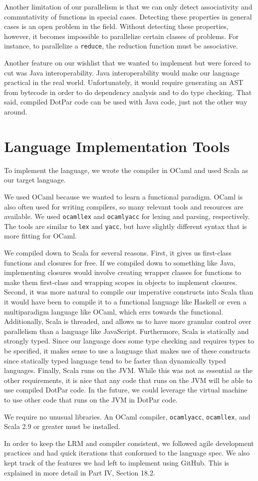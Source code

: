Another limitation of our parallelism is that we can only detect associativity
and commutativity of functions in special cases. Detecting these properties in
general cases is an open problem in the field. Without detecting these
properties, however, it becomes impossible to parallelize certain classes of
problems. For instance, to parallelize a \verb$reduce$, the reduction function
must be associative.

Another feature on our wishlist that we wanted to implement but were forced to cut was Java
interoperability. Java interoperability would make our language practical in the
real world. Unfortunately, it would require generating an AST from bytecode in
order to do dependency analysis and to do type checking. That said, compiled
DotPar code can be used with Java code, just not the other way around.

\section{Language Implementation Tools}
To implement the language, we wrote the compiler in OCaml and used Scala as our
target language.

We used OCaml because we wanted to learn a functional paradigm. OCaml is also
often used for writing compilers, so many relevant tools and resources are
available. We used \verb$ocamllex$ and \verb$ocamlyacc$ for lexing and parsing,
respectively. The tools are similar to \verb$lex$ and \verb$yacc$, but have
slightly different syntax that is more fitting for OCaml.

We compiled down to Scala for several reasons. First, it gives us first-class
functions and closures for free. If we compiled down to something like Java,
implementing closures would involve creating wrapper classes for functions to
make them first-class and wrapping scopes in objects to implement closures.
Second, it was more natural to compile our imperative constructs into Scala than
it would have been to compile it to a functional language like Haskell or even a
multiparadigm language like OCaml, which errs towards the functional.
Additionally, Scala is threaded, and allows us to have more granular control
over parallelism than a language like JavaScript. Furthermore, Scala is
statically and strongly typed. Since our language does some type checking and
requires types to be specified, it makes sense to use a language that makes use
of these constructs since statically typed language tend to be faster than
dynamically typed languages. Finally, Scala runs on the JVM\@. While this was not
as essential as the other requirements, it is nice that any code that runs on
the JVM will be able to use compiled DotPar code. In the future, we could
leverage the virtual machine to use other code that runs on the JVM in DotPar
code.

We require no unusual libraries. An OCaml compiler, \verb$ocamlyacc$,
\verb$ocamllex$, and Scala 2.9 or greater must be installed.

In order to keep the LRM and compiler consistent, we followed agile development
practices and had quick iterations that conformed to the language spec. We also
kept track of the features we had left to implement using GitHub. This is
explained in more detail in Part IV, Section 18.2.
